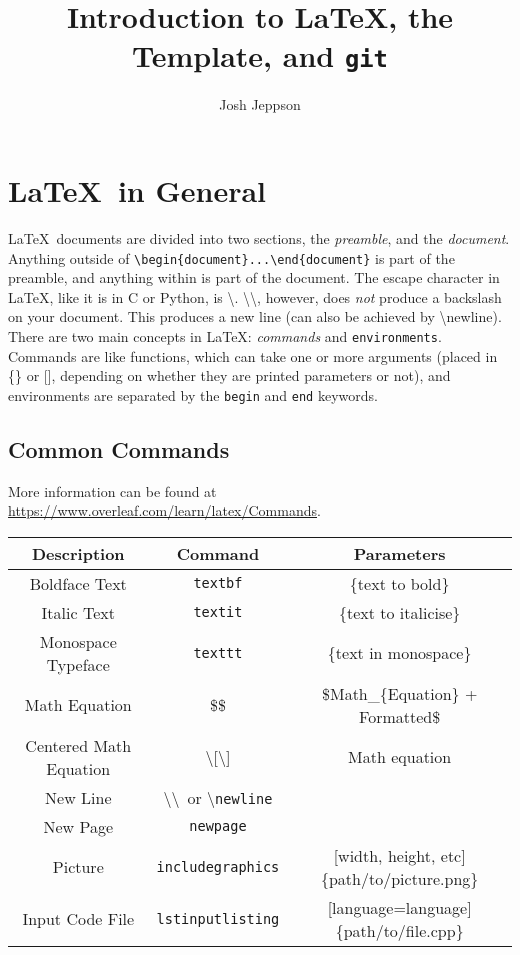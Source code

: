\documentclass[a4paper,10pt]{article}
\title{Introduction to \LaTeX, the Template, and \texttt{git}}
\author{Josh Jeppson}
\begin{document}
\maketitle
\section{\LaTeX\ in General}

\LaTeX\ documents are divided into two sections, the \emph{preamble}, and the \emph{document}. Anything outside of \texttt{\textbackslash begin\{document\}...\textbackslash end\{document\}} is part of the preamble, and anything within is part of the document. The escape character in \LaTeX, like it is in C or Python, is \textbackslash. \textbackslash\textbackslash, however, does \emph{not} produce a backslash on your document. This produces a new line (can also be achieved by \textbackslash newline).
\\[10pt]
There are two main concepts in \LaTeX: \emph{commands} and \texttt{environments}. Commands are like functions, which can take one or more arguments (placed in \{\} or [], depending on whether they are printed parameters or not), and environments are separated by the \texttt{begin} and \texttt{end} keywords.

\subsection{Common Commands}

More information can be found at \url{https://www.overleaf.com/learn/latex/Commands}.

\begin{center}
	\begin{tabular}{|c|c|c|} \hline
		\textbf{Description} & \textbf{Command} & \textbf{Parameters} \\ \hline
		Boldface Text & \texttt{textbf} & \{text to bold\}\\
		Italic Text & \texttt{textit} & \{text to italicise\} \\
		Monospace Typeface  & \texttt{texttt} & \{text in monospace\} \\
		Math Equation & \$\$ & \$Math\_\{Equation\} + Formatted\$ \\
		Centered Math Equation & \textbackslash[\textbackslash] & Math equation  \\
		New Line & \textbackslash\textbackslash\ or \textbackslash \texttt{newline} & \\
		New Page &  \texttt{newpage} & \\
		Picture & \texttt{includegraphics} & [width, height, etc]\{path/to/picture.png\} \\
		Input Code File & \texttt{lstinputlisting} & [language=language]\{path/to/file.cpp\} \\ \hline
	\end{tabular}
\end{center}
\end{document}
